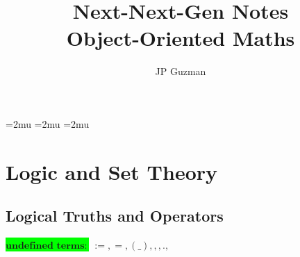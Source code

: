 \documentclass[a4paper]{article}
\title{Next-Next-Gen Notes \\
\large Object-Oriented Maths}
\author{JP Guzman}
\newcommand{\tdb}[1]{\colorbox{lime}{$\displaystyle #1$}}
\newcommand{\defeq}{:=}
\newcommand{\eq}{=}
\newcommand{\cusand}{,}
\newcommand{\cusend}{.}
\begin{document}
\maketitle
\allowdisplaybreaks


\thinmuskip=2mu %
\medmuskip=2mu %
\thickmuskip=2mu %
\setlength{\belowdisplayskip}{0pt} \setlength{\belowdisplayshortskip}{0pt}
\setlength{\abovedisplayskip}{0pt} \setlength{\abovedisplayshortskip}{0pt}



\section{Logic and Set Theory}
\subsection{Logical Truths and Operators}
\tdb{\textbf{undefined terms}:} $%
   \defeq, %
   \eq, %
   (\_), %
   \cusand, %
   \cusend, %
$
\end{document}
